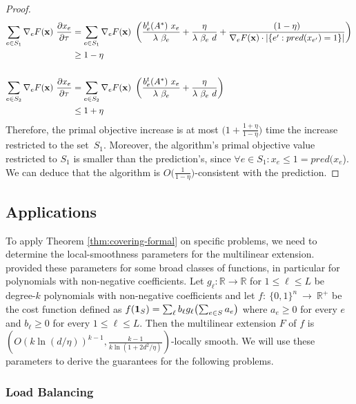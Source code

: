 \begin{proof}
\begin{align*}
\sum_{e \in S_{1}} \nabla_{e} F(\mathbf{x})\ \frac{\partial x_{e}}{ \partial \tau}
&= \sum_{e \in S_{1}} \nabla_{e} F(\mathbf{x})
	\ \left( \frac{b^{t}_{e}(A^{*}) \ x_{e}}{\lambda\ \beta_{e}} + \frac{\eta}{\lambda\ \beta_{e}\ d}
		 + \frac{(1 - \eta)}{\nabla_{e} F(\mathbf{x}) \cdot |\{e': pred(x_{e'}) = 1\}| }
 \right)\\
 &\geq 1 - \eta \\ \\
 \sum_{e \in S_{2}} \nabla_{e} F(\mathbf{x})\ \frac{\partial x_{e}}{ \partial \tau}
&= \sum_{e \in S_{2}} \nabla_{e} F(\mathbf{x})
	\ \left( \frac{b^{t}_{e}(A^{*}) \ x_{e}}{\lambda\ \beta_{e}} + \frac{\eta}{\lambda\ \beta_{e}\ d} \right)\\
&\leq 1 + \eta
\end{align*}
Therefore, the primal objective increase is at most $\bigl(1 +  \frac{1 + \eta}{1 - \eta} \bigr)$ time the increase restricted to
the set~$S_{1}$. Moreover, the algorithm's primal objective value restricted to $S_{1}$ is smaller than
the prediction's, since $\forall e \in S_{1} : x_{e} \leq 1 = pred(x_{e}$).
We can deduce that the algorithm is $O\bigl( \frac{1}{1 - \eta} \bigr)$-consistent with the prediction.
\end{proof}
\setcounter{theorem}{5}

\subsection{Applications}
To apply Theorem \ref{thm:covering-formal} on specific problems, we need to determine the local-smoothness parameters for the multilinear extension.
\cite{Thang20:Online-Primal-Dual} provided these parameters for some broad classes of functions, in particular for polynomials with non-negative coefficients. Let $g_{\ell}: \mathbb{R} \rightarrow \mathbb{R}$ for $1 \leq \ell \leq L$
be degree-$k$ polynomials with non-negative coefficients and let $f:~\{0,1\}^{n}~\rightarrow~\mathbb{R}^{+}$ be the cost function
defined as $f(\mathbf{1}_{S}) = \sum_{\ell} b_{\ell} g_{\ell}\bigl( \sum_{e \in S} a_{e} \bigr)$ where $a_{e} \geq 0$ for every
$e$ and $b_{\ell} \geq 0$ for every $1 \leq \ell \leq L$.
Then the multilinear extension $F$ of $f$ is $(O(k \ln(d/\eta))^{k-1}, \frac{k-1}{k \ln(1 + 2d^{2}/\eta)})$-locally smooth.
We will use these parameters to derive the guarantees for the following problems.

\subsubsection{Load Balancing}

